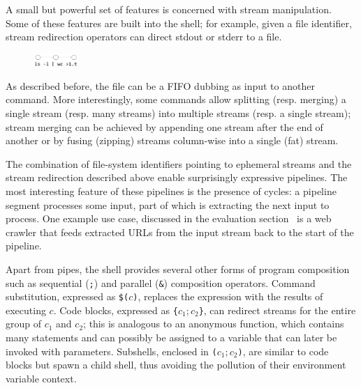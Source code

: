 \documentclass[sigplan,10pt,review,anonymous]{acmart}
\newcommand{\ttt}[1]{\texttt{\small #1}}
\begin{document}
A small but powerful set of features is concerned with stream manipulation.
Some of these features are built into the shell;
  for example, given a file identifier, stream redirection operators can direct stdout or stderr to a file.
\begin{figure}
  \vspace{-15pt}
    \includegraphics[width=0.15\textwidth]{./figs/dish_ex3.pdf}
  \vspace{-25pt}
\end{figure}
As described before, the file can be a FIFO dubbing as input to another command.
More interestingly, some commands allow splitting (resp. merging) a single stream (resp. many streams) into multiple streams (resp. a single stream);
  stream merging can be achieved by appending one stream after the end of another or by fusing (zipping) streams column-wise into a single (fat) stream.


The combination of file-system identifiers pointing to ephemeral streams and the stream redirection described above enable surprisingly expressive pipelines. %
The most interesting feature of these pipelines is the presence of cycles:
  a pipeline segment processes some input, part of which is extracting the next input to process.
One example use case, discussed in the evaluation section~ is a web crawler that feeds extracted URLs from the input stream back to the start of the pipeline.

Apart from pipes, the \unix shell provides several other forms of program composition such as sequential (\ttt{;}) and parallel (\ttt{\&}) composition operators.
Command substitution, expressed as \ttt{\$($c$)}, replaces the expression with the results of executing $c$.
Code blocks, expressed as \ttt{\{$c_1; c_2$\}}, can redirect streams for the entire group of $c_1$ and $c_2$;
  this is analogous to an anonymous function, which contains many statements and can possibly be assigned to a variable that can later be invoked with parameters.
Subshells, enclosed in \ttt{($c_1; c_2$)}, are similar to code blocks but spawn a child shell, thus avoiding the pollution of their environment variable context. %
\end{document}
